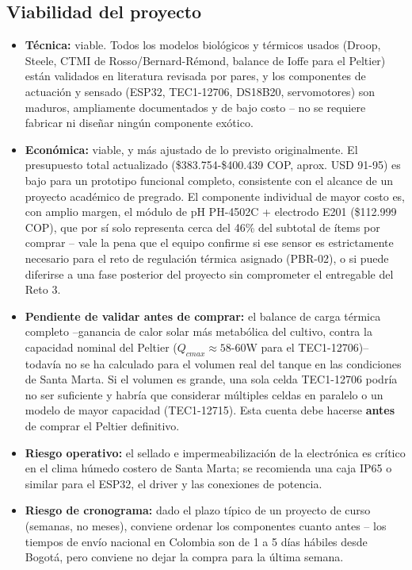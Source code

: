 \documentclass[11pt,a4paper]{article}
\begin{document}
\subsection{Viabilidad del proyecto}
\begin{itemize}
    \item \textbf{Técnica:} viable. Todos los modelos biológicos y térmicos usados (Droop, Steele, CTMI de Rosso/Bernard-Rémond, balance de Ioffe para el Peltier) están validados en literatura revisada por pares, y los componentes de actuación y sensado (ESP32, TEC1-12706, DS18B20, servomotores) son maduros, ampliamente documentados y de bajo costo -- no se requiere fabricar ni diseñar ningún componente exótico.
    \item \textbf{Económica:} viable, y más ajustado de lo previsto originalmente. El presupuesto total actualizado (\$383.754-\$400.439 COP, aprox. USD 91-95) es bajo para un prototipo funcional completo, consistente con el alcance de un proyecto académico de pregrado. El componente individual de mayor costo es, con amplio margen, el módulo de pH PH-4502C + electrodo E201 (\$112.999 COP), que por sí solo representa cerca del 46\% del subtotal de ítems por comprar -- vale la pena que el equipo confirme si ese sensor es estrictamente necesario para el reto de regulación térmica asignado (PBR-02), o si puede diferirse a una fase posterior del proyecto sin comprometer el entregable del Reto 3.
    \item \textbf{Pendiente de validar antes de comprar:} el balance de carga térmica completo --ganancia de calor solar más metabólica del cultivo, contra la capacidad nominal del Peltier ($Q_{cmax}\approx 58$-$60$W para el TEC1-12706)-- todavía no se ha calculado para el volumen real del tanque en las condiciones de Santa Marta. Si el volumen es grande, una sola celda TEC1-12706 podría no ser suficiente y habría que considerar múltiples celdas en paralelo o un modelo de mayor capacidad (TEC1-12715). Esta cuenta debe hacerse \textbf{antes} de comprar el Peltier definitivo.
    \item \textbf{Riesgo operativo:} el sellado e impermeabilización de la electrónica es crítico en el clima húmedo costero de Santa Marta; se recomienda una caja IP65 o similar para el ESP32, el driver y las conexiones de potencia.
    \item \textbf{Riesgo de cronograma:} dado el plazo típico de un proyecto de curso (semanas, no meses), conviene ordenar los componentes cuanto antes -- los tiempos de envío nacional en Colombia son de 1 a 5 días hábiles desde Bogotá, pero conviene no dejar la compra para la última semana.
\end{itemize}
\end{document}
